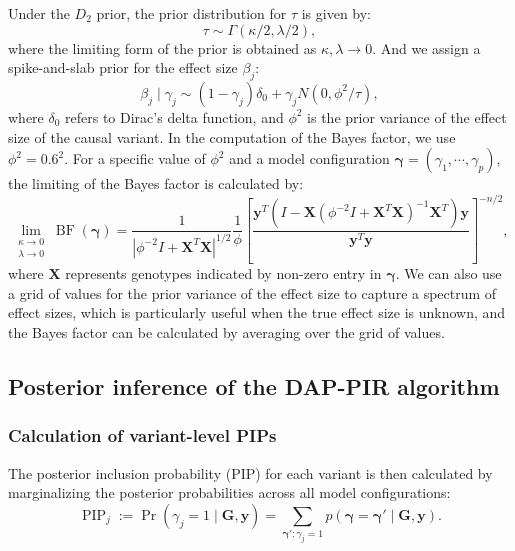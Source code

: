 \documentclass[pdflatex,sn-mathphys-num]{sn-jnl}%
\theoremstyle{thmstyleone}%
\theoremstyle{thmstyletwo}%
\theoremstyle{thmstylethree}%
\begin{document}
Under the $D_2$ prior, the prior distribution for $\tau$ is given by:
$$\tau \sim \Gamma\left(\kappa/2, \lambda/2\right),$$
where the limiting form of the prior is obtained as $\kappa,\lambda \rightarrow 0$. And we assign a spike-and-slab prior for the effect size $\beta_j$:
$$\beta_j \mid \gamma_j \sim (1-\gamma_j)\delta_0 + \gamma_j N\left(0, \phi^2/\tau\right),$$
where $\delta_0$ refers to Dirac's delta function, and $\phi^2$ is the prior variance of the effect size of the causal variant. In the computation of the Bayes factor, we use $\phi^2=0.6^2$. For a specific value of $\phi^2$ and a model configuration $\boldsymbol{\gamma}=\left(\gamma_1,\cdots,\gamma_{p}\right)$, the limiting of the Bayes factor is calculated by:
\begin{equation}
    \lim _{\substack{\kappa \rightarrow 0 \\ \lambda \rightarrow 0}} \operatorname{BF}(\boldsymbol{\gamma})= \frac{1}{|\phi^{-2}I + \mathbf{X}^T\mathbf{X}|^{1 / 2}}  \frac{1}{\phi} \left[\frac{\mathbf{y}^T\left(I-\mathbf{X}\left(\phi^{-2}I+\mathbf{X}^T \mathbf{X}\right)^{-1} \mathbf{X}^T\right) \mathbf{y}}{\mathbf{y}^T \mathbf{y}}\right]^{-n / 2},
\end{equation}
where $\mathbf{X}$ represents genotypes indicated by non-zero entry in $\boldsymbol{\gamma}$. We can also use a grid of values for the prior variance of the effect size to capture a spectrum of effect sizes, which is particularly useful when the true effect size is unknown, and the Bayes factor can be calculated by averaging over the grid of values.



\subsection{Posterior inference of the DAP-PIR algorithm}
\subsubsection{Calculation of variant-level PIPs}
The posterior inclusion probability (PIP) for each variant is then calculated by marginalizing the posterior probabilities across all model configurations:
\begin{equation}
    \operatorname{PIP}_j:=\operatorname{Pr}\left(\gamma_j=1 \mid \mathbf{G},\mathbf{y}\right)=\sum_{\boldsymbol{\gamma}':\gamma_j=1} p(\boldsymbol{\gamma}=\boldsymbol{\gamma}' \mid \mathbf{G},\mathbf{y}).
\end{equation}
\end{document}
